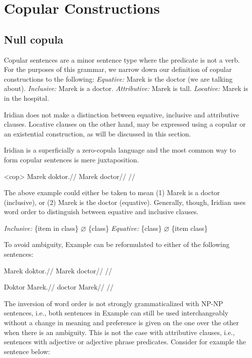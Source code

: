 \section{Copular Constructions}
\subsection{Null copula}

Copular sentences are a minor sentence type where the predicate is not a verb. For the purposes of this grammar, we narrow down our definition of copular constructions to the following:
\pex
\a \textit{Equative:} Marek is the doctor (we are talking about).
\a \textit{Inclusive:} Marek is a doctor.
\a \textit{Attributive:} Marek is tall.
\a \textit{Locative:} Marek is in the hospital.
\xe

Iridian does not make a distinction between equative, inclusive and attributive clauses. Locative clauses on the other hand, may be expressed using a copular or an existential construction, as will be discussed in this section.

Iridian is a superficially a zero-copula language and the most common way to form copular sentences is mere juxtaposition.

\pex<cop>
\begingl
\gla Marek doktor.//
\glb Marek doctor//
\glft {}//
\endgl
\xe

The above example could either be taken to mean (1) Marek is a doctor (inclusive), or (2) Marek is the doctor (equative). Generally, though, Iridian uses word order to distinguish between equative and inclusive clauses.

\pex
\a \textit{Inclusive:} \{item in class\} $\varnothing$ \{class\}
\a \textit{Equative:} \{class\} $\varnothing$ \{item class\}
\xe

To avoid ambiguity, Example  can be reformulated to either of the following sentences:

\a
\begingl
\gla Marek doktor.//
\glb Marek doctor//
\glft {}//
\endgl

\a
\begingl
\gla Doktor Marek.//
\glb doctor Marek//
\glft {}//
\endgl

\xe

The inversion of word order is not strongly grammaticalized with NP-NP sentences, i.e., both sentences in Example  can still be used interchangeably without a change in meaning and preference is given on the one over the other when there is an ambiguity. This is not the case with attributive clauses, i.e., sentences with adjective or adjective phrase predicates. Consider for example the sentence below:

